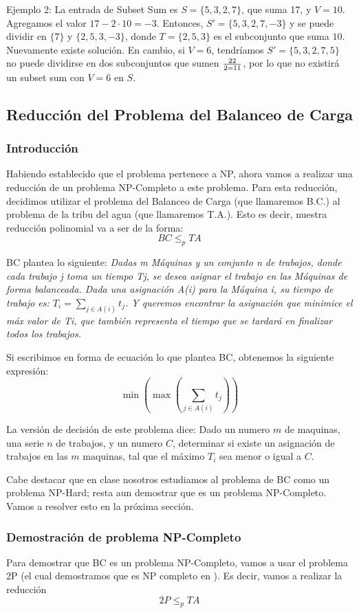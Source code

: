 \documentclass{article}
\begin{document}
Ejemplo 2: La entrada de Subset Sum es \( S = \{5, 3, 2, 7\} \), que suma 17, y \( V = 10 \). Agregamos el valor $17 - 2 \cdot 10 = -3$. Entonces, \( S' = \{5, 3, 2, 7, -3\} \) y se puede dividir en  \( \{7\} \) y \( \{2, 5, 3, -3\} \), donde \( T = \{2, 5, 3\} \) es el subconjunto que suma \( 10 \). Nuevamente existe solución. En cambio, si $V = 6$, tendríamos \( S' = \{5, 3, 2, 7, 5\} \) no puede dividirse en dos subconjuntos que sumen $22 \over 2 = 11$, por lo que no existirá un subset sum con $V = 6$ en $S$.

\subsection{Reducción del Problema del Balanceo de Carga}
\subsubsection{Introducción}
Habiendo establecido que el problema pertenece a NP, ahora vamos a realizar una reducción de un problema NP-Completo a este problema.
Para esta reducción, decidimos utilizar el problema del Balanceo de Carga (que llamaremos B.C.) al problema de la tribu del agua (que llamaremos T.A.). Esto es decir, nuestra reducción polinomial va a ser de la forma:
$$
BC \leq_p TA
$$

BC plantea lo siguiente: 
\textit{Dadas m Máquinas y un conjunto n de trabajos, donde cada trabajo j toma un tiempo Tj, se desea asignar el trabajo en las Máquinas de forma balanceada. Dada una asignación A(i) para la Máquina i, su tiempo de trabajo es: $T_{i} =\displaystyle{\sum_{j \in A(i)} t_j}$. Y queremos encontrar la asignación que minimice el máx valor de Ti, que también representa el tiempo que se tardará en finalizar todos los trabajos.}

Si escribimos en forma de ecuación lo que plantea BC, obtenemos la siguiente expresión:
$$
\min( \max (\displaystyle{\sum_{j \in A(i)} t_j}))
$$

La versión de decisión de este problema dice: Dado un numero $m$ de maquinas, una serie $n$ de trabajos, y un numero $C$, determinar si existe un asignación de trabajos en las $m$ maquinas, tal que el máximo $T_i$ sea menor o igual a $C$.

Cabe destacar que en clase nosotros estudiamos al problema de BC como un problema NP-Hard; resta aun demostrar que es un problema NP-Completo. Vamos a resolver esto en la próxima sección.

\subsubsection{Demostración de problema NP-Completo}
\label{sec:np-completo-bc}
Para demostrar que BC es un problema NP-Completo, vamos a usar el problema 2P (el cual demostramos que es NP completo en ). Es decir, vamos a realizar la reducción
$$
2P \leq_p TA
$$
\end{document}
